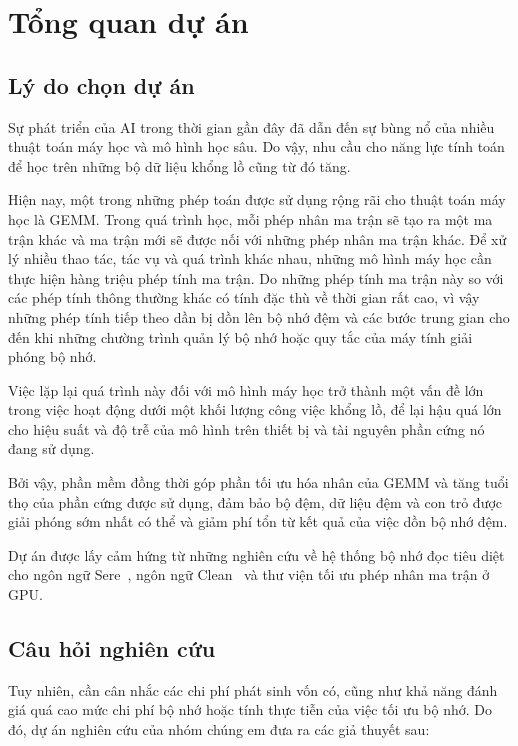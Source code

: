\documentclass[a4paper]{article}
\begin{document}
	
	\newpage
	
	\section{Tổng quan dự án}
	\label{sec:tongquan}
	
	\subsection{Lý do chọn dự án}
	
        Sự phát triển của AI trong thời gian gần đây đã dẫn đến sự bùng nổ của nhiều thuật toán máy học và mô hình học sâu. Do vậy, nhu 
        cầu cho năng lực tính toán để học trên những bộ dữ liệu khổng lồ
        cũng từ đó tăng.
		
		Hiện nay, một trong những phép toán được sử dụng rộng rãi cho thuật toán máy học là GEMM. Trong quá trình học, mỗi phép nhân ma trận sẽ tạo ra một ma trận khác và ma trận mới sẽ được nối với những phép nhân ma trận khác. Để xử lý nhiều thao tác, tác vụ và quá trình khác nhau, những mô hình máy học cần thực hiện hàng triệu phép tính ma trận. Do những phép tính ma trận này so với các phép tính thông thường khác có tính đặc thù về thời gian rất cao, vì vậy những phép tính tiếp theo dần bị dồn lên bộ nhớ đệm và các bước trung gian cho đến khi những chường trình quản lý bộ nhớ hoặc quy tắc của máy tính giải phóng bộ nhớ.
        
        Việc lặp lại quá trình này đối với mô hình máy học trở thành một vấn đề lớn trong việc hoạt động dưới một khối lượng công việc khổng lồ, để lại hậu quá lớn cho hiệu suất và độ trễ của mô hình trên thiết bị và tài nguyên phần cứng nó đang sử dụng.

        Bởi vậy, phần mềm đồng thời góp phần tối ưu hóa nhân của GEMM và tăng tuổi thọ của phần cứng được sử dụng, đảm bảo bộ đệm, dữ liệu đệm và con trỏ được giải phóng sớm nhất có thể và giảm phí tổn từ kết quả của việc dồn bộ nhớ đệm.

	    Dự án được lấy cảm hứng từ những nghiên cứu về hệ thống bộ nhớ đọc tiêu diệt cho ngôn ngữ Sere~\cite{sere}, ngôn ngữ Clean~\cite{clean} và thư viện tối ưu phép nhân ma trận ở GPU.
	
	\subsection{Câu hỏi nghiên cứu}
	
	Tuy nhiên, cần cân nhắc các chi phí phát sinh vốn có, cũng như khả năng đánh giá quá cao mức chi phí bộ nhớ hoặc tính thực tiễn của việc tối ưu bộ nhớ. Do đó, dự án nghiên cứu của nhóm chúng em đưa ra các giả thuyết sau:
	
\end{document}
